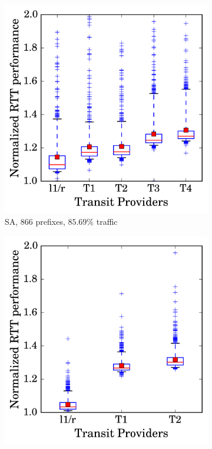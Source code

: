 \begin{figure}
\centering
		\centering
        \begin{subfigure}[b]{0.48\textwidth}
                \includegraphics[width=\textwidth]{gfx/chap2/np_box_sa.png}
                \caption{SA, 866 prefixes, $85.69\%$ traffic}
                \label{fig:np_sa}
        \end{subfigure}
        \begin{subfigure}[b]{0.48\textwidth}
                \includegraphics[width=\textwidth]{gfx/chap2/np_box_sb.png}

\end{subfigure}
\end{figure}
